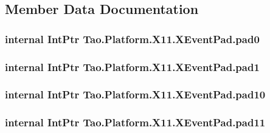 \subsection{Member Data Documentation}
\hypertarget{struct_tao_1_1_platform_1_1_x11_1_1_x_event_pad_acc4a291626b0a0c83b5bb98e8a1a8871}{
\subsubsection[{pad0}]{\setlength{\rightskip}{0pt plus 5cm}internal IntPtr {\bf Tao.Platform.X11.XEventPad.pad0}}}
\label{struct_tao_1_1_platform_1_1_x11_1_1_x_event_pad_acc4a291626b0a0c83b5bb98e8a1a8871}
\hypertarget{struct_tao_1_1_platform_1_1_x11_1_1_x_event_pad_a88f4857ef53b9974b99e92f89b43a621}{
\subsubsection[{pad1}]{\setlength{\rightskip}{0pt plus 5cm}internal IntPtr {\bf Tao.Platform.X11.XEventPad.pad1}}}
\label{struct_tao_1_1_platform_1_1_x11_1_1_x_event_pad_a88f4857ef53b9974b99e92f89b43a621}
\hypertarget{struct_tao_1_1_platform_1_1_x11_1_1_x_event_pad_a4f85a9b1f91e5350543672de5a1ce07a}{
\subsubsection[{pad10}]{\setlength{\rightskip}{0pt plus 5cm}internal IntPtr {\bf Tao.Platform.X11.XEventPad.pad10}}}
\label{struct_tao_1_1_platform_1_1_x11_1_1_x_event_pad_a4f85a9b1f91e5350543672de5a1ce07a}
\hypertarget{struct_tao_1_1_platform_1_1_x11_1_1_x_event_pad_a7e82eada3d8d9fadc7e66c99a8574fc9}{
\subsubsection[{pad11}]{\setlength{\rightskip}{0pt plus 5cm}internal IntPtr {\bf Tao.Platform.X11.XEventPad.pad11}}}
